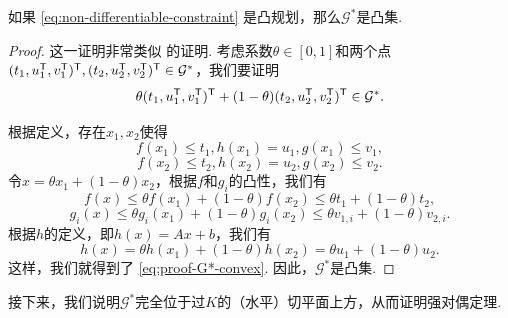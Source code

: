 \begin{lemma}\label{lemma:G*-convex}
    如果 \eqref{eq:non-differentiable-constraint} 是凸规划，那么$\mathcal G^*$是凸集.
\end{lemma}
\begin{proof}
    这一证明非常类似 的证明. 考虑系数$\theta\in[0,1]$和两个点$(t_1,u_1^{\mathsf{T}},v_1^{\mathsf{T}})^{\mathsf{T}},(t_2,u_2^{\mathsf{T}},v_2^{\mathsf{T}})^{\mathsf{T}}\in\mathcal G^*$，我们要证明
    \begin{equation}
        \theta(t_1,u_1^{\mathsf{T}},v_1^{\mathsf{T}})^{\mathsf{T}}+(1-\theta)(t_2,u_2^{\mathsf{T}},v_2^{\mathsf{T}})^{\mathsf{T}}\in\mathcal G^*.\label{eq:proof-G*-convex}
    \end{equation}
    
    根据定义，存在$x_1,x_2$使得
    \[f(x_1)\leq t_1, h(x_1)=u_1, g(x_1)\leq v_1,\]
    \[f(x_2)\leq t_2, h(x_2)=u_2, g(x_2)\leq v_2.\]
    令$x=\theta x_1+(1-\theta)x_2$，根据$f$和$g_i$的凸性，我们有
    \[f(x)\leq \theta f(x_1)+(1-\theta)f(x_2)\leq \theta t_1+(1-\theta)t_2,\]
    \[g_i(x)\leq \theta g_i(x_1)+(1-\theta)g_i(x_2)\leq \theta v_{1,i}+(1-\theta)v_{2,i}.\]
    根据$h$的定义，即$h(x)=Ax+b$，我们有
    \[h(x)=\theta h(x_1)+(1-\theta)h(x_2)=\theta u_1+(1-\theta)u_2.\]
    这样，我们就得到了 \eqref{eq:proof-G*-convex}. 因此，$\mathcal G^*$是凸集.
\end{proof}

接下来，我们说明$\mathcal G^*$完全位于过$K$的（水平）切平面上方，从而证明强对偶定理.

